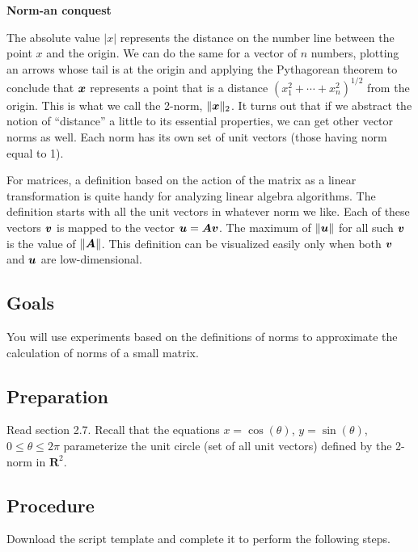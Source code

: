 \documentclass[11pt]{article}
\begin{document}
\begin{center}
  \bf Norm-an conquest
\end{center}

The absolute value $|x|$ represents the distance on the number line
between the point $x$ and the origin. We can do the same for a vector
of $n$ numbers, plotting an arrows whose tail is at the origin and
applying the Pythagorean theorem to conclude that $\bm{x}$ represents a
point that is a distance $(x_1^2 + \cdots + x_n^2)^{1/2}$ from the
origin. This is what we call the 2-norm, $\|\bm{x}\|_2$. It turns out
that if we abstract the notion of ``distance'' a little to its
essential properties, we can get other vector norms as well. Each norm has its own set of unit vectors (those having norm equal to 1).

For matrices, a definition based on the action of the
matrix as a linear transformation is quite handy for analyzing linear
algebra algorithms.  The definition starts with all the unit vectors
in whatever norm we like. Each of these
vectors $\bm{v}$ is mapped to the vector $\bm{u}=\bm{A}\bm{v}$. The maximum of
$\|\bm{u}\|$ for all such $\bm{v}$ is the value of $\|\bm{A}\|$. This
definition can be visualized easily only when both $\bm{v}$ and
$\bm{u}$ are low-dimensional.

\subsection*{Goals}

You will use experiments based on the definitions of norms to approximate the calculation of norms of a small matrix.

\subsection*{Preparation}

Read section 2.7. Recall that the equations $x=\cos(\theta)$, $y=\sin(\theta)$, $0\le \theta \le 2\pi$ parameterize the unit circle (set of all unit vectors) defined by the 2-norm in $\mathbf{R}^2$.

\subsection*{Procedure}

Download the script template and complete it to perform the following steps.
\end{document}
